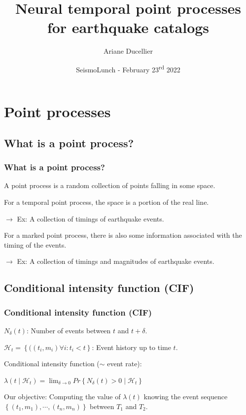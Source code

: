 \documentclass{beamer}
\title[Neural temporal point processes for earthquake catalogs]{Neural temporal point processes for earthquake catalogs}
\author{Ariane Ducellier}
\institute{University of Washington}
\date{SeismoLunch - February 23\textsuperscript{rd} 2022}
\begin{document}
	\begin{frame}
		\titlepage
	\end{frame}

	\section{Point processes}
	\subsection{What is a point process?}

	\begin{frame}
		\frametitle{What is a point process?}
		A point process is a random collection of points falling in some space.

		\vspace{1em}

		For a temporal point process, the space is a portion of the real line.

		\vspace{1em}

		$\rightarrow$ Ex: A collection of timings of earthquake events.

		\vspace{2em}

		For a marked point process, there is also some information associated with the timing of the events.

		\vspace{1em}

		$\rightarrow$ Ex: A collection of timings and magnitudes of earthquake events.
	\end{frame}

	\subsection{Conditional intensity function (CIF)}

	\begin{frame}
		\frametitle{Conditional intensity function (CIF)}
		$N_{\delta} \left( t \right)$: Number of events between $t$ and $t + \delta$.

		\vspace{1em}

		$\mathcal{H}_t =  \left\{ (\left( t_i , m_i \right) \forall i : t_i < t \right\} $: Event history up to time $t$.

		\vspace{2em}

		Conditional intensity function ($\sim$ event rate):

		\vspace{1em}

		$\lambda \left( t \mid \mathcal{H}_t \right) = \lim_{\delta \rightarrow 0} Pr \left\{ N_{\delta} \left( t \right) > 0 \mid \mathcal{H}_t \right\}$

		\vspace{2em}

		Our objective: Computing the value of $\lambda \left( t \right)$ knowing the event sequence $\left\{ \left(t_1 , m_1 \right) , \cdots , \left( t_n , m_n \right) \right\}$ between $T_1$ and $T_2$.
	\end{frame}
\end{document}
